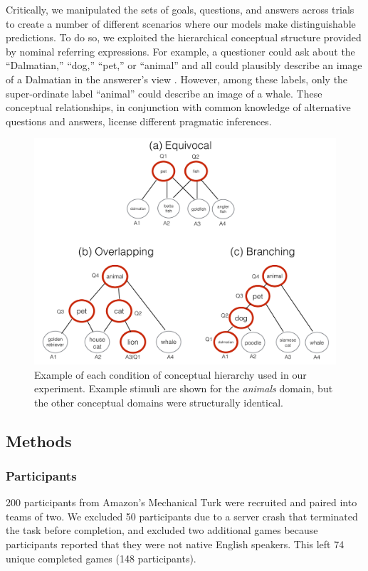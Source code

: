 \documentclass[11pt, floatsintext]{apa6}
\begin{document}
Critically, we manipulated the sets of goals, questions, and answers across trials to create a number of different scenarios where our models make distinguishable predictions.
To do so, we exploited the hierarchical conceptual structure provided by nominal referring expressions.
For example, a questioner could ask about the ``Dalmatian,'' ``dog,'' ``pet,'' or ``animal'' and all could plausibly describe an image of a Dalmatian in the answerer's view \cite{Brown58_HowShallAThingBeCalled,GrafEtAl16_BasicLevel}. 
However, among these labels, only the super-ordinate label ``animal'' could describe an image of a whale.
These conceptual relationships, in conjunction with common knowledge of alternative questions and answers, license different pragmatic inferences.

\begin{figure}[th!]
\begin{center}
\includegraphics[scale = .5]{Exp1/hierarchyStructureExamples.pdf}
\end{center}
\caption{\footnotesize  Example of each condition of conceptual hierarchy used in our experiment. Example stimuli are shown for the \emph{animals} domain, but the other conceptual domains were structurally identical.}
\label{fig:hierarchyStructures}
\end{figure}

\subsection{Methods}
\subsubsection{Participants} 
200 participants from Amazon's Mechanical Turk were recruited and paired into teams of two.
We excluded 50 participants due to a server crash that terminated the task before completion, and
excluded two additional games because participants reported that they were not native English speakers. 
This left 74 unique completed games (148 participants).
\end{document}

